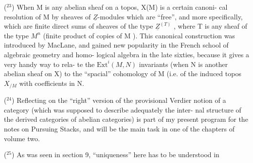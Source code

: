 (${}^{23}$) When M is any abelian sheaf on a topos,  X(M) is a certain canoni-%
cal  resolution of M by sheaves of $\underline{Z}$-modules which are ``free'', and more
specifically, which are finite direct sums of sheaves of the type
$\underline{Z}^{(T)}$ , where T is any sheaf of the type $M^{n}$ (finite product of copies of
M ). This canonical construction was introduced  by MacLane, and
gained new popularity in the French school of algebraic geometry and homo-%
logical algebra in the late sixties, because 
 it gives a very handy way to rela-%
te the $\mathrm{Ext}^{i}(M,N)$ invariants (when N is another abelian sheaf on X) to
the  ``spacial'' cohomology of M (i.e. of the induced topos $X_{/M}$\hand{)} with
coefficients in N.

(${}^{24}$) Reflecting on the ``right'' version of the provisional Verdier notion
of a   category (which was supposed to describe adequately\deleted{\unsure{,}} the  inter-%
nal structure of the derived categories of abelian categories) is part of
my present program for the notes on Pursuing Stacks, and will be the main
task in one of the chapters of volume two.   

(${}^{25}$) As was seen in section 9, ``uniqueness'' here has to be understood in

